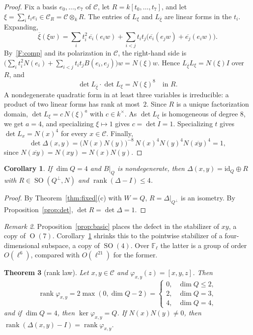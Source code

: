 \documentclass[11pt]{amsart}
\newtheorem{theorem}{Theorem}[section]
\newtheorem{corollary}[theorem]{Corollary}
\theoremstyle{definition}
\theoremstyle{remark}
\newtheorem{remark}[theorem]{Remark}
\newcommand{\F}{\mathbb{F}}
\newcommand{\C}{\mathcal{C}}
\newcommand{\conj}[1]{\overline{#1}}
\newcommand{\assoc}[3]{[#1,#2,#3]}
\DeclareMathOperator{\rank}{rank}
\DeclareMathOperator{\Ort}{O}
\DeclareMathOperator{\SO}{SO}
\begin{document}
\begin{proof}
Fix a basis $e_0,\dots,e_7$ of $\C$, let $R=k[t_0,\dots,t_7]$, and let
$\xi=\sum_it_ie_i\in\C_R=\C\otimes_kR$. The entries of $L_\xi$ and
$L_{\conj\xi}$ are linear forms in the $t_i$. Expanding,
\[
  \conj\xi(\xi w)
  =\sum_it_i^2\,\conj{e_i}(e_iw)
   +\sum_{i<j}t_it_j\bigl(\conj{e_i}(e_jw)+\conj{e_j}(e_iw)\bigr).
\]
By~\ref{F:comp} and its polarization in $\C$, the right-hand side is
$\bigl(\sum_it_i^2N(e_i)+\sum_{i<j}t_it_jB(e_i,e_j)\bigr)w=N(\xi)w$. Hence
$L_{\conj\xi}L_\xi=N(\xi)I$ over $R$, and
\[
  \det L_{\conj\xi}\cdot\det L_\xi=N(\xi)^8\quad\text{in }R.
\]
A nondegenerate quadratic form in at least three variables is irreducible: a
product of two linear forms has rank at most~$2$. Since $R$ is a unique
factorization domain, $\det L_\xi=c\,N(\xi)^a$ with $c\in k^\times$. As
$\det L_\xi$ is homogeneous of degree $8$, we get $a=4$, and specializing
$\xi\mapsto1$ gives $c=\det I=1$. Specializing $t$ gives $\det L_x=N(x)^4$ for
every $x\in\C$. Finally,
\[
  \det\Delta(x,y)=\bigl(N(x)N(y)\bigr)^{-8}\,N(x)^4N(y)^4N(\conj{xy})^4=1,
\]
since $N(\conj{xy})=N(xy)=N(x)N(y)$.
\end{proof}

\begin{corollary}\label{cor:so4}
If $\dim Q=4$ and $B|_Q$ is nondegenerate, then
$\Delta(x,y)=\mathrm{id}_Q\oplus R$ with $R\in\SO(Q^\perp,N)$ and $\rank(\Delta-I)\le4$.
\end{corollary}

\begin{proof}
By Theorem~\ref{thm:fixed}(c) with $W=Q$, $R=\Delta|_{Q^\perp}$ is an isometry.
By Proposition~\ref{prop:det}, $\det R=\det\Delta=1$.
\end{proof}

\begin{remark}
Proposition~\ref{prop:basic} places the defect in the stabilizer of $xy$, a
copy of $\Ort(7)$. Corollary~\ref{cor:so4} shrinks this to the pointwise
stabilizer of a four-dimensional subspace, a copy of $\SO(4)$. Over
$\F_\ell$ the latter is a group of order $O(\ell^6)$, compared with
$O(\ell^{21})$ for the former.
\end{remark}

\begin{theorem}[rank law]\label{thm:rank}
Let $x,y\in\C$ and $\varphi_{x,y}(z)=\assoc xyz$. Then
\[
  \rank\varphi_{x,y}=2\max(0,\dim Q-2)=
  \begin{cases}0,&\dim Q\le2,\\ 2,&\dim Q=3,\\ 4,&\dim Q=4,\end{cases}
\]
and if $\dim Q=4$, then $\ker\varphi_{x,y}=Q$. If $N(x)N(y)\neq0$, then
$\rank(\Delta(x,y)-I)=\rank\varphi_{x,y}$.
\end{theorem}
\end{document}
